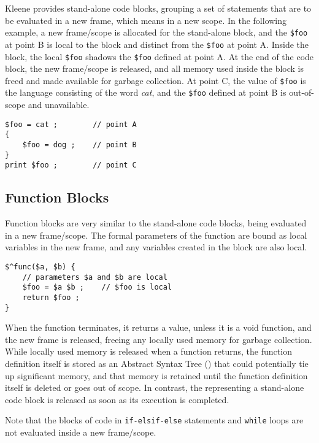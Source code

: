 Kleene provides stand-alone code blocks, grouping a set of statements
that are to be evaluated in a new frame, which means in a new scope.
In the following example, a new frame/scope is allocated for the
stand-alone block, and the \verb!$foo! at point B is local to the block
and distinct from the
\verb!$foo! at point A. Inside the block, the local \verb!$foo! shadows
the \verb!$foo! defined at point A.  At the end of the code block, the new
frame/scope is released, and all memory used inside the block is freed
and made available for garbage collection.  At point C, the value of \verb!$foo! is the
language consisting of the word \emph{cat}, and the \verb!$foo! defined
at point B is out-of-scope and unavailable.

\begin{Verbatim}
$foo = cat ;        // point A
{
    $foo = dog ;    // point B
}
print $foo ;        // point C
\end{Verbatim}

\subsection{Function Blocks}

Function blocks are very similar to the stand-alone code blocks, being
evaluated in a new frame/scope.  The formal parameters of the function are
bound as local variables in the
new frame, and any variables created in the block are also local.


\begin{Verbatim}
$^func($a, $b) {
    // parameters $a and $b are local
    $foo = $a $b ;    // $foo is local
    return $foo ;
}
\end{Verbatim}

\noindent
When the function terminates, it returns a value, unless it is a void function, and the
new frame is released, freeing any locally used memory for garbage
collection.  While locally used memory is released when a function returns, the
function definition itself is stored as an Abstract Syntax Tree () that could
potentially tie up 
significant memory, and that memory is retained until the function definition
itself is deleted or goes out of scope.  In contrast, the  representing a
stand-alone code block is released as soon as its execution is completed.

Note that the blocks of code in \texttt{if-elsif-else} statements and \texttt{while}
loops are not evaluated inside a new frame/scope.

